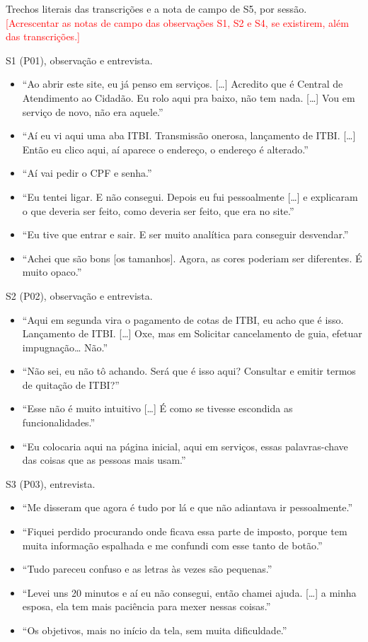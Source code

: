 \documentclass[
  12pt,
  oneside,
  a4paper,
  chapter=TITLE,
  section=TITLE,
  english,
  brazilian
]{abntex2}
\newcommand{\preencher}[1]{\textcolor{red}{[#1]}}
\begin{document}
\begin{apendicesenv}
Trechos literais das transcrições e a nota de campo de S5, por sessão. \preencher{Acrescentar as notas de campo das observações S1, S2 e S4, se existirem, além das transcrições.}

S1 (P01), observação e entrevista.
\begin{itemize}
  \item ``Ao abrir este site, eu já penso em serviços. [\ldots] Acredito que é
    Central de Atendimento ao Cidadão. Eu rolo aqui pra baixo, não tem nada. [\ldots]
    Vou em serviço de novo, não era aquele.''
  \item ``Aí eu vi aqui uma aba ITBI. Transmissão onerosa, lançamento de ITBI. [\ldots]
    Então eu clico aqui, aí aparece o endereço, o endereço é alterado.''
  \item ``Aí vai pedir o CPF e senha.''
  \item ``Eu tentei ligar. E não consegui. Depois eu fui pessoalmente [\ldots] e
    explicaram o que deveria ser feito, como deveria ser feito, que era no site.''
  \item ``Eu tive que entrar e sair. E ser muito analítica para conseguir
    desvendar.''
  \item ``Achei que são bons [os tamanhos]. Agora, as cores poderiam ser
    diferentes. É muito opaco.''
\end{itemize}

S2 (P02), observação e entrevista.
\begin{itemize}
  \item ``Aqui em segunda vira o pagamento de cotas de ITBI, eu acho que é
    isso. Lançamento de ITBI. [\ldots] Oxe, mas em Solicitar cancelamento de guia,
    efetuar impugnação\ldots{} Não.''
  \item ``Não sei, eu não tô achando. Será que é isso aqui? Consultar e emitir
    termos de quitação de ITBI?''
  \item ``Esse não é muito intuitivo [\ldots] É como se tivesse escondida as
    funcionalidades.''
  \item ``Eu colocaria aqui na página inicial, aqui em serviços, essas
    palavras-chave das coisas que as pessoas mais usam.''
\end{itemize}

S3 (P03), entrevista.
\begin{itemize}
  \item ``Me disseram que agora é tudo por lá e que não adiantava ir pessoalmente.''
  \item ``Fiquei perdido procurando onde ficava essa parte de imposto, porque tem
    muita informação espalhada e me confundi com esse tanto de botão.''
  \item ``Tudo pareceu confuso e as letras às vezes são pequenas.''
  \item ``Levei uns 20 minutos e aí eu não consegui, então chamei ajuda. [\ldots]
    a minha esposa, ela tem mais paciência para mexer nessas coisas.''
  \item ``Os objetivos, mais no início da tela, sem muita dificuldade.''
\end{itemize}


\end{apendicesenv}
\end{document}
